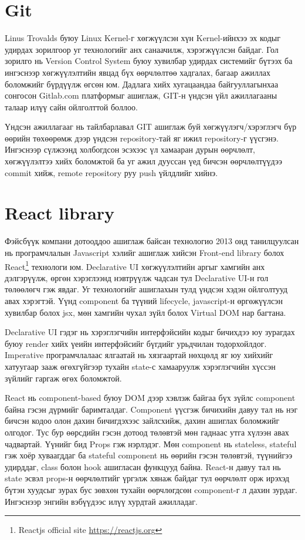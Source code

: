 \section{Git}
Linus Trovalds буюу Linux Kernel-г хөгжүүлсэн хүн Kernel-ийнхээ эх кодыг удирдах зорилгоор уг технологийг анх санаачилж, хэрэгжүүлсэн байдаг. Гол зорилго нь Version Control System буюу хувилбар удирдах системийг бүтээх ба ингэснээр хөгжүүлэлтийн явцад бүх өөрчлөлтөө хадгалах, багаар ажиллах боломжийг бүрдүүлж өгсөн юм. Дадлага хийх хугацаандаа байгууллагынхаа сонгосон Gitlab.com платформыг ашиглаж, GIT-н үндсэн үйл ажиллагааны талаар илүү сайн ойлголттой боллоо. 

Үндсэн ажиллагааг нь тайлбарлавал GIT ашиглаж буй хөгжүүлэгч/хэрэглэгч бүр өөрийн төхөөрөмж дээр үндсэн repository-тай яг ижил repository-г үүсгэнэ. Ингэснээр сүлжээнд холбогдсон эсэхээс үл хамааран дурын өөрчлөлт, хөгжүүлэлтээ хийх боломжтой ба уг ажил дууссан үед бичсэн өөрчлөлтүүдээ commit хийж, remote repository руу push үйлдлийг хийнэ.

\section{React library}
Фэйсбүүк компани дотооддоо ашиглаж байсан технологио 2013 онд танилцуулсан нь програмчлалын Javascript хэлийг ашиглаж хийсэн Front-end library болох React\footnote{Reactjs official site \url{https://reactjs.org}} технологи юм. Declarative UI хөгжүүлэлтийн аргыг хамгийн анх дэлгэрүүлж, өргөн хэрэглээнд нэвтрүүлж чадсан тул Declarative UI-н гол төлөөлөгч гэж явдаг. Уг технологийг ашиглахын тулд үндсэн хэдэн ойлголтууд авах хэрэгтэй. Үүнд component ба түүний lifecycle, javascript-н өргөжүүлсэн хувилбар болох jsx, мөн хамгийн чухал зүйл болох Virtual DOM нар багтана. 

Declarative UI гэдэг нь хэрэглэгчийн интерфэйсийн кодыг бичихдээ юу зурагдах буюу render хийх үеийн интерфэйсийг бүгдийг урьдчилан тодорхойлдог. Imperative програмчлалаас ялгаатай нь хязгаартай нөхцөлд яг юу хийхийг хатуугаар зааж өгөхгүйгээр тухайн state-с хамааруулж хэрэглэгчийн хүссэн зүйлийг гаргаж өгөх боломжтой.   

React нь component-based буюу DOM дээр хэвлэж байгаа бүх зүйлс component байна гэсэн дүрмийг баримталдаг. Component үүсгэж бичихийн давуу тал нь нэг бичсэн кодоо олон дахин бичигдэхээс зайлсхийж, дахин ашиглах боломжийг олгодог. Тус бур өөрсдийн гэсэн дотоод төлөвтэй мөн гаднаас утга хүлээн авах чадвартай. Үүнийг бид Props гэж нэрлэдэг. Мөн component нь stateless, stateful гэж хоёр хуваагддаг ба stateful component нь өөрийн гэсэн төлөвтэй, түүнийгээ удирддаг, class болон hook ашигласан функцууд байна. React-н давуу тал нь state эсвэл props-н өөрчлөлтийг үргэлж хянаж байдаг тул өөрчлөлт орж ирэхэд бүтэн хуудсыг зурах бус зөвхөн тухайн өөрчлөгдсөн component-г л дахин зурдаг. Ингэснээр энгийн вэбүүдээс илүү хурдтай ажилладаг.

